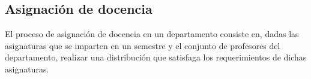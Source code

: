 
\subsection{Asignación de docencia}
El proceso de asignación de docencia en un departamento consiste en, 
dadas las asignaturas que se imparten en un semestre y el conjunto de 
profesores del departamento, realizar una distribución que satisfaga los
requerimientos de dichas asignaturas.




